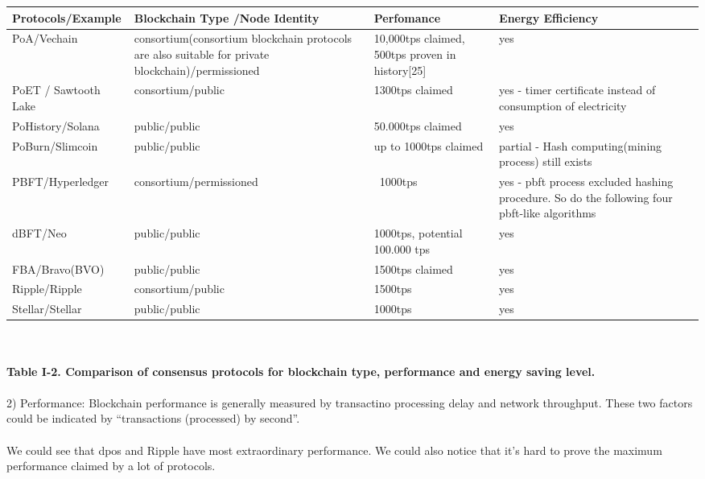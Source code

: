 \documentclass[]{article}
\begin{document}
\begin{CJK*}{UTF8}{gbsn}
\begin{tabular}{p{2cm}p{3cm}p{3cm}p{3cm}}
\hline
Protocols/E\-xample & Blockchain Type \newline /Node Identity & Perfo\-mance & Energy Efficiency \\ \hline
PoA/Vechain & consortium\newline(consortium blockchain protocols are also suitable for private blockchain)/permi\-ssioned & 10,000tps claimed, 500tps proven in history[25] & yes \\ \hline
PoET / Sawtooth Lake & consortium/public & 1300tps claimed & yes - timer certificate instead of consumption of electricity  \\ \hline
PoHistory/\newline Solana & public/public & 50.000tps claimed  & yes \\ \hline
PoBurn/\newline Slimcoin & public/public & up \newline to 1000tps claimed & partial - Hash computing(mining process) still exists  \\ \hline
PBFT/Hyp\-erledger & consortium/permi\-ssioned & ~1000tps & yes - pbft process excluded hashing procedure. So do the following four pbft-like algorithms  \\ \hline
dBFT/Neo & public/public & 1000tps, potential 100.000 tps & yes  \\ \hline
FBA/Bravo\newline(BVO) & public/public & 1500tps claimed & yes  \\ \hline
Ripple/Ripple & consortium/public & 1500tps & yes \\ \hline
Stellar/Stellar & public/public & 1000tps & yes \\ \hline
\end{tabular}\\
\paragraph{Table I-2. Comparison of consensus protocols for blockchain type, performance and energy saving level.}

\paragraph{}
2) Performance: Blockchain performance is generally measured by transactino processing delay and network throughput. These two factors could be indicated by ``transactions (processed) by second''. 
\paragraph{}
We could see that dpos and Ripple have most extraordinary performance. We could also notice that it's hard to prove the maximum performance claimed by a lot of protocols. 

\end{CJK*}
\end{document}
